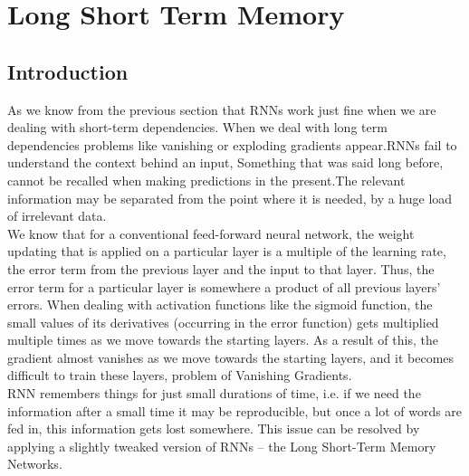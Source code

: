 \section{Long Short Term Memory}
\label{chap:Long Short Term Memory}

\subsection{Introduction}
As we know from the previous section that RNNs work just fine when we are dealing with short-term dependencies.
When we deal with long term dependencies problems like vanishing or exploding gradients appear.RNNs fail to understand the context behind an input, Something that was said long before, cannot be recalled when making predictions in the present.The relevant information may be separated from the point where it is needed, by a huge load of irrelevant data.\\
We know that for a conventional feed-forward neural network, the weight updating that is applied on a particular layer is a multiple of the learning rate, the error term from the previous layer and the input to that layer. Thus, the error term for a particular layer is somewhere a product of all previous layers’ errors. When dealing with activation functions like the sigmoid function, the small values of its derivatives (occurring in the error function) gets multiplied multiple times as we move towards the starting layers. As a result of this, the gradient almost vanishes as we move towards the starting layers, and it becomes difficult to train these layers, problem of Vanishing Gradients.\\
RNN remembers things for just small durations of time, i.e. if we need the information after a small time it may be reproducible, but once a lot of words are fed in, this information gets lost somewhere. This issue can be resolved by applying a slightly tweaked version of RNNs – the Long Short-Term Memory Networks.\cite{web005}

